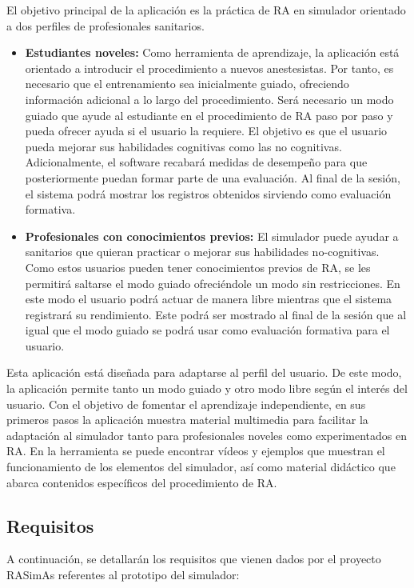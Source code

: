 El objetivo principal de la aplicación es la práctica de \ac{RA} en simulador orientado a dos perfiles de profesionales sanitarios.
\begin{itemize}
    \item \textbf{Estudiantes noveles:} Como herramienta de aprendizaje, la aplicación está orientado a introducir el procedimiento a nuevos anestesistas. Por tanto, es necesario que el entrenamiento sea inicialmente guiado, ofreciendo información adicional a lo largo del procedimiento. Será necesario un modo guiado que ayude al estudiante en el procedimiento de \ac{RA} paso por paso y pueda ofrecer ayuda si el usuario la requiere. El objetivo es que el usuario pueda mejorar sus habilidades cognitivas como las no cognitivas. Adicionalmente, el software recabará medidas de desempeño para que posteriormente puedan formar parte de una evaluación. Al final de la sesión, el sistema podrá mostrar los registros obtenidos sirviendo como evaluación formativa.

\item \textbf{Profesionales con conocimientos previos:} El simulador puede ayudar a sanitarios que quieran practicar o mejorar sus habilidades no-cognitivas. Como estos usuarios pueden tener conocimientos previos de \ac{RA}, se les permitirá saltarse el modo guiado ofreciéndole un modo sin restricciones. En este modo el usuario podrá actuar de manera libre mientras que el sistema registrará su rendimiento. Este podrá ser mostrado al final de la sesión que al igual que el modo guiado se podrá usar como evaluación formativa para el usuario.

\end{itemize}


Esta aplicación está diseñada para adaptarse al perfil del usuario. De este modo, la aplicación permite tanto un modo guiado y otro modo libre según el interés del usuario. 
Con el objetivo de fomentar el aprendizaje independiente, en sus primeros pasos la aplicación muestra material multimedia para facilitar la adaptación al simulador tanto para profesionales noveles como experimentados en \ac{RA}. En la herramienta se puede encontrar vídeos y ejemplos que muestran el funcionamiento de los elementos del simulador, así como material didáctico que abarca contenidos específicos del procedimiento de \ac{RA}.



\subsection{Requisitos}
\label{course:req}
A continuación, se detallarán los requisitos que vienen dados por el proyecto \ac{RASimAs} referentes al prototipo del simulador:


